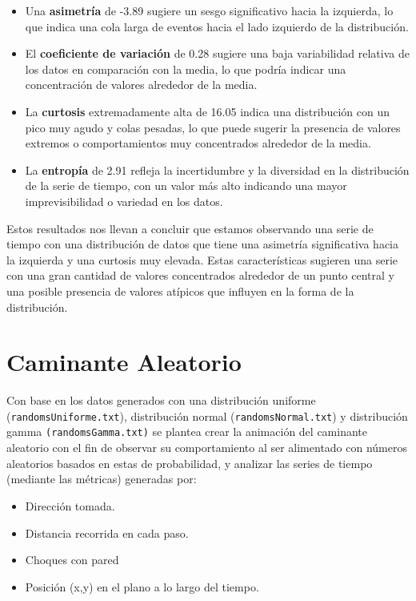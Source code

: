 \documentclass[11pt]{article} %
\begin{document}
\begin{itemize}
		\item Una \textbf{asimetría} de -3.89 sugiere un sesgo significativo hacia la izquierda, lo que indica una cola larga de eventos hacia el lado izquierdo de la distribución.
		
		\item El \textbf{coeficiente de variación} de 0.28 sugiere una baja variabilidad relativa de los datos en comparación con la media, lo que podría indicar una concentración de valores alrededor de la media.
		
		\item La \textbf{curtosis} extremadamente alta de 16.05 indica una distribución con un pico muy agudo y colas pesadas, lo que puede sugerir la presencia de valores extremos o comportamientos muy concentrados alrededor de la media.
		
		\item La \textbf{entropía} de 2.91 refleja la incertidumbre y la diversidad en la distribución de la serie de tiempo, con un valor más alto indicando una mayor imprevisibilidad o variedad en los datos.
	\end{itemize}
	
	Estos resultados nos llevan a concluir que estamos observando una serie de tiempo con una distribución de datos que tiene una asimetría significativa hacia la izquierda y una curtosis muy elevada. Estas características sugieren una serie con una gran cantidad de valores concentrados alrededor de un punto central y una posible presencia de valores atípicos que influyen en la forma de la distribución.
	
	
	\section{Caminante Aleatorio}
	
	Con base en los datos generados con una distribución uniforme (\texttt{randomsUniforme.txt}), distribución normal (\texttt{randomsNormal.txt}) y distribución gamma \texttt{(randomsGamma.txt)} se plantea crear la animación del caminante aleatorio con el fin de observar su comportamiento al ser alimentado con números aleatorios basados en estas de probabilidad, y analizar las series de tiempo (mediante las métricas) generadas por:
	
	\begin{itemize}
		\item Dirección tomada.
		\item Distancia recorrida en cada paso.
		\item Choques con pared
		\item Posición (x,y) en el plano a lo largo del tiempo.
	\end{itemize}
	
\end{document}
